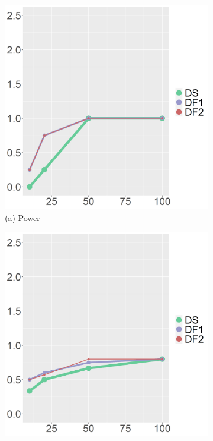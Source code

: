 \captionsetup[subfigure]{labelformat=empty}
\begin{figure}[ht!]
\centering
\begin{subfigure}[b]{.32\columnwidth} 
    \includegraphics[width=\columnwidth]{../../plot/power_1_med.png}
    \caption{(a) Power}
\end{subfigure}
\hfill
\centering
\begin{subfigure}[b]{.32\columnwidth} 
    \includegraphics[width=\columnwidth]{../../plot/precision_1_med.png}

\end{subfigure}
\end{figure}

